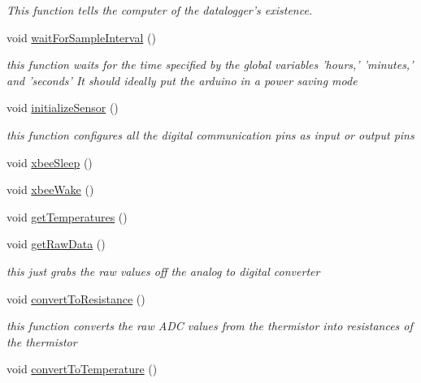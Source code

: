 \begin{CompactItemize}
\begin{CompactList}\small\item\em This function tells the computer of the datalogger's existence. \item\end{CompactList}\item 
void \hyperlink{temperature__sensor___terciopelo_8pde_b4dbd8380e5d93ead613cf38e6083b7f}{waitForSampleInterval} ()
\begin{CompactList}\small\item\em this function waits for the time specified by the global variables 'hours,' 'minutes,' and 'seconds' It should ideally put the arduino in a power saving mode \item\end{CompactList}\item 
void \hyperlink{temperature__sensor___terciopelo_8pde_f6c9587ccbcf223f8c79f508c2fef366}{initializeSensor} ()
\begin{CompactList}\small\item\em this function configures all the digital communication pins as input or output pins \item\end{CompactList}\item 
void \hyperlink{temperature__sensor___terciopelo_8pde_a06edc5122b70b3231ff87d8234fe759}{xbeeSleep} ()
\item 
void \hyperlink{temperature__sensor___terciopelo_8pde_884c5dd8e3bb500063c819db197db666}{xbeeWake} ()
\item 
void \hyperlink{temperature__sensor___terciopelo_8pde_ea28af0c7128421a38589128bb39ef1c}{getTemperatures} ()
\item 
void \hyperlink{temperature__sensor___terciopelo_8pde_cfc975251dbc3a8c9a9b11f8df62cc41}{getRawData} ()
\begin{CompactList}\small\item\em this just grabs the raw values off the analog to digital converter \item\end{CompactList}\item 
void \hyperlink{temperature__sensor___terciopelo_8pde_8e666a34a083b1806167ca991be0c436}{convertToResistance} ()
\begin{CompactList}\small\item\em this function converts the raw ADC values from the thermistor into resistances of the thermistor \item\end{CompactList}\item 
void \hyperlink{temperature__sensor___terciopelo_8pde_3aa4f99331713009a70ee34eba83754b}{convertToTemperature} ()
\end{CompactItemize}
